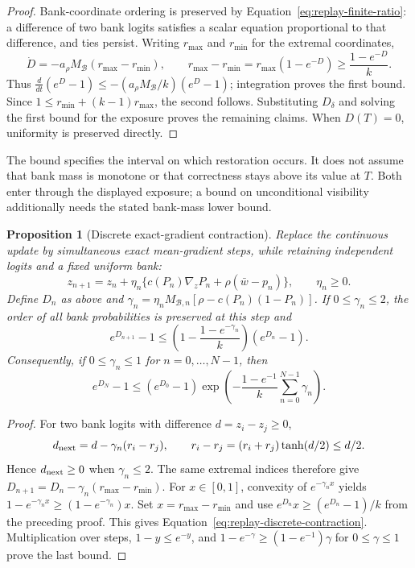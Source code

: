 \documentclass{article}
\newcommand{\enforcehalffinalproseline}{%
  \setlength{\parfillskip}{0pt plus .20\linewidth}}
\newcommand{\1}{\mathbf 1}
\newtheorem{proposition}[lemma]{Proposition}
\theoremstyle{remark}
\theoremstyle{definition}
\theoremstyle{plain}
\begin{document}
\begin{proof}
\enforcehalffinalproseline
Bank-coordinate ordering is preserved by
Equation~\eqref{eq:replay-finite-ratio}: a difference of two bank logits
satisfies a scalar equation proportional to that difference, and ties persist.
Writing $r_{\max}$ and $r_{\min}$ for the extremal coordinates,
\[
 \dot D=-a_\rho M_{\mathcal B}(r_{\max}-r_{\min}),
 \qquad
 r_{\max}-r_{\min}
   =r_{\max}(1-e^{-D})\ge\frac{1-e^{-D}}{k}.
\]
Thus $\frac{d}{dt}(e^D-1)\le
 -(a_\rho M_{\mathcal B}/k)(e^D-1)$; integration proves the first bound.
Since $1\le r_{\min}+(k-1)r_{\max}$, the second follows. Substituting
$D_\delta$ and solving the first bound for the exposure proves the remaining
claims. When $D(T)=0$, uniformity is preserved directly.
\end{proof}

The bound specifies the interval on which restoration occurs. It does not
assume that bank mass is monotone or that correctness stays above its value
at $T$. Both enter through the displayed exposure; a bound on unconditional
visibility additionally needs the stated bank-mass lower bound.

\begin{proposition}[Discrete exact-gradient contraction]
\enforcehalffinalproseline
\label{prop:replay-discrete-contraction}
Replace the continuous update by simultaneous exact mean-gradient steps,
while retaining independent logits and a fixed uniform bank:
\[
 z_{n+1}=z_n+\eta_n\{c(P_n)\nabla_zP_n+
                         \rho(\bar w-p_n)\},\qquad \eta_n\ge0.
\]
Define $D_n$ as above and
$\gamma_n=\eta_n M_{\mathcal B,n}
 [\rho-c(P_n)(1-P_n)]$.
If $0\le\gamma_n\le2$, the order of all bank probabilities is preserved
at this step and
\begin{equation}
 e^{D_{n+1}}-1\le
 \left(1-\frac{1-e^{-\gamma_n}}{k}\right)(e^{D_n}-1).
 \label{eq:replay-discrete-contraction}
\end{equation}
Consequently, if $0\le\gamma_n\le1$ for $n=0,\ldots,N-1$, then
\[
 e^{D_N}-1\le(e^{D_0}-1)
  \exp\!\left(-\frac{1-e^{-1}}{k}
                    \sum_{n=0}^{N-1}\gamma_n\right).
\]
\end{proposition}

\begin{proof}
\enforcehalffinalproseline
For two bank logits with difference $d=z_i-z_j\ge0$,
\[
 d_{\rm next}=d-\gamma_n(r_i-r_j),\qquad
 r_i-r_j=(r_i+r_j)\tanh(d/2)\le d/2.
\]
Hence $d_{\rm next}\ge0$ when $\gamma_n\le2$. The same extremal indices
therefore give
$D_{n+1}=D_n-\gamma_n(r_{\max}-r_{\min})$.
For $x\in[0,1]$, convexity of $e^{-\gamma_nx}$ yields
$1-e^{-\gamma_nx}\ge(1-e^{-\gamma_n})x$. Set
$x=r_{\max}-r_{\min}$ and use
$e^{D_n}x\ge(e^{D_n}-1)/k$ from the preceding proof. This gives
Equation~\eqref{eq:replay-discrete-contraction}. Multiplication over steps,
$1-y\le e^{-y}$, and
$1-e^{-\gamma}\ge(1-e^{-1})\gamma$ for $0\le\gamma\le1$ prove the last
bound.
\end{proof}
\end{document}
